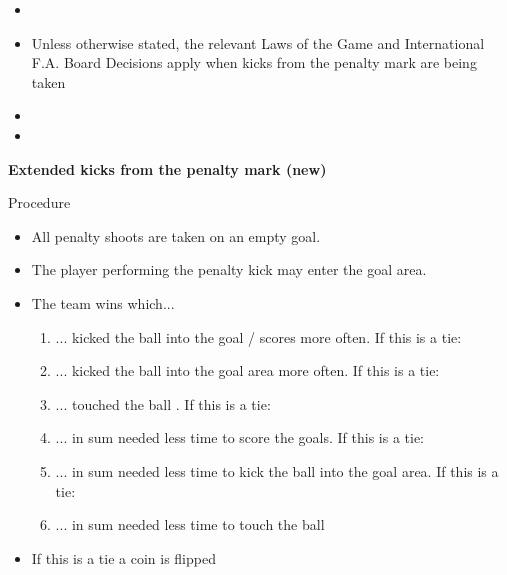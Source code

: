 \begin{itemize}
{      remain on the field of play, outside the penalty area in which the kicks.
      All players, except the player taking the kick and the two goalkeepers,
      must remain within the centre circle)}
\item {}
\item Unless otherwise stated, the relevant Laws of the Game and International F.A. Board Decisions apply when kicks from the penalty mark are being taken
\item {}
\item {}
\end{itemize}


{\bfseries Extended kicks from the penalty mark (new) }

\bigskip

Procedure

\headlinebox

\begin{itemize}
\item All penalty shoots are taken on an empty goal.
\item The player performing the penalty kick may enter the goal area.
\item The team wins which...
\begin{enumerate}
\item ... kicked the ball into the goal / scores more often. If this is a tie:
\item ... kicked the ball into the goal area more often. If this is a tie:
\item ... touched the ball  . If this is a tie:
\item ... in sum needed less time to score the goals. If this is a tie:
\item ... in sum needed less time to kick the ball into the goal area. If this is a tie:
\item ... in sum needed less time to touch the ball
\end{enumerate}
\item If this is a tie a coin is flipped 
\end{itemize}
